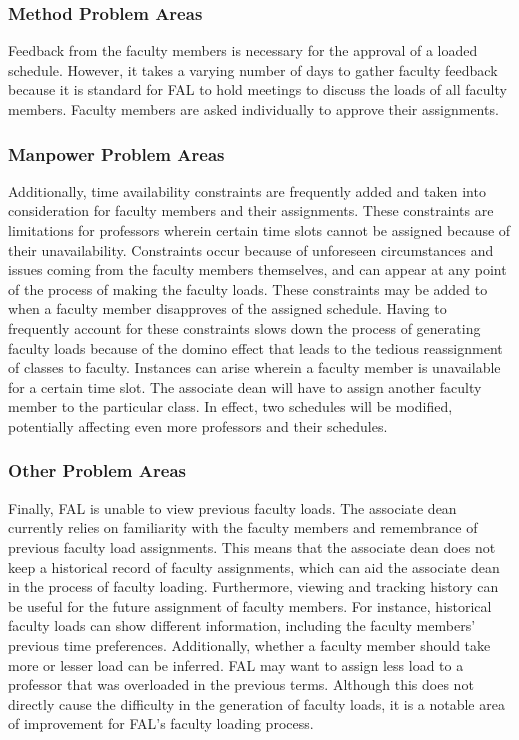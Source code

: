 \subsubsection{Method Problem Areas}
Feedback from the faculty members is necessary for the approval of a loaded schedule. However, it takes a varying number of days to gather faculty feedback because it is standard for FAL to hold meetings to discuss the loads of all faculty members. Faculty members are asked individually to approve their assignments.

\subsubsection{Manpower Problem Areas}
Additionally, time availability constraints are frequently added and taken into consideration for faculty members and their assignments. These constraints are limitations for professors wherein certain time slots cannot be assigned because of their unavailability. Constraints occur because of unforeseen circumstances and issues coming from the faculty members themselves, and can appear at any point of the process of making the faculty loads. These constraints may be added to when a faculty member disapproves of the assigned schedule. Having to frequently account for these constraints slows down the process of generating faculty loads because of the domino effect that leads to the tedious reassignment of classes to faculty. Instances can arise wherein a faculty member is unavailable for a certain time slot. The associate dean will have to assign another faculty member to the particular class. In effect, two schedules will be modified, potentially affecting even more professors and their schedules.

\subsubsection{Other Problem Areas}
Finally, FAL is unable to view previous faculty loads. The associate dean currently relies on familiarity with the faculty members and remembrance of previous faculty load assignments. This means that the associate dean does not keep a historical record of faculty assignments, which can aid the associate dean in the process of faculty loading. Furthermore, viewing and tracking history can be useful for the future assignment of faculty members. For instance, historical faculty loads can show different information, including the faculty members’ previous time preferences. Additionally, whether a faculty member should take more or lesser load can be inferred. FAL may want to assign less load to a professor that was overloaded in the previous terms. Although this does not directly cause the difficulty in the generation of faculty loads, it is a notable area of improvement for FAL's faculty loading process.

